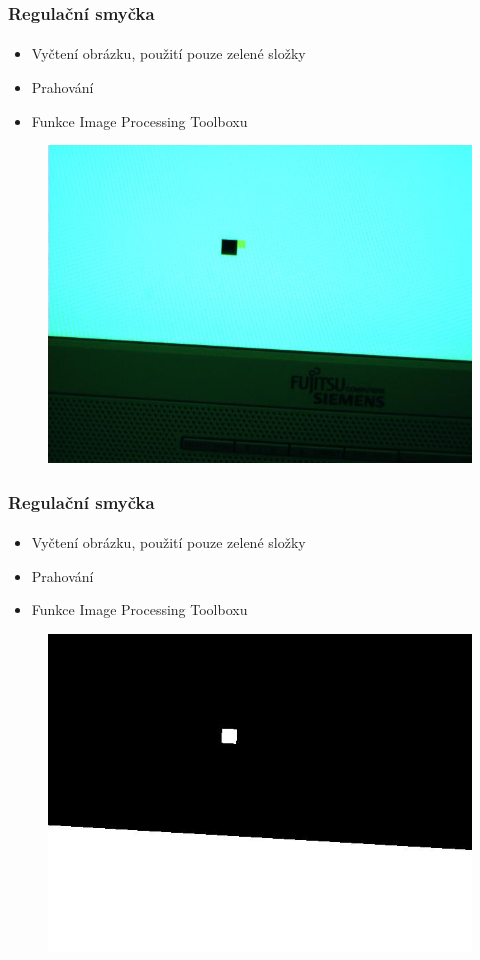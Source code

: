\documentclass{beamer}
\begin{document}
\begin{frame}
\frametitle{Regulační smyčka}
 \framesubtitle{}
   \begin{itemize}
  \item Vyčtení obrázku, použití pouze zelené složky
  \item Prahování 
  \item Funkce Image Processing Toolboxu
 \end{itemize}
  \begin{figure}[!htb]
	\includegraphics[width=0.49\columnwidth]{pics/zpracovani_obrazu-1}
  \end{figure}
\end{frame}

\begin{frame}
\frametitle{Regulační smyčka}
 \framesubtitle{}
  \begin{itemize}
  \item Vyčtení obrázku, použití pouze zelené složky
  \item Prahování 
  \item Funkce Image Processing Toolboxu
 \end{itemize}
  \begin{figure}[!htb]
	\includegraphics[width=0.49\columnwidth]{pics/zpracovani_obrazu-2}
  \end{figure}
\end{frame}
\end{document}

